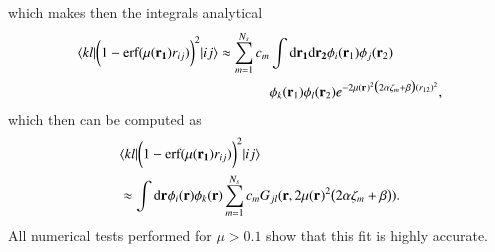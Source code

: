 \documentclass[aip,jcp,reprint,noshowkeys,superscriptaddress]{revtex4-1}
\newcommand{\matelem}[3]{\langle #1 | #2 | #3 \rangle}
\newcommand{\br}[0]{{\bf {r}}}
\newcommand{\bri}[1]{{\bf r}_{#1}}
\newcommand{\dr}[1]{\text{d}{\bf r_{#1}}}
\newcommand{\mur}[1]{\mu({\bf r_{#1}})}
\begin{document}
which makes then the integrals analytical
\begin{equation}
 \begin{aligned}
 \matelem{kl}{\bigg(1 -  \text{erf}(\mur{1} r_{ij}) \bigg)^2}{ij}  \approx \sum_{m=1}^{N_s} c_m &\int \dr{1} \dr{2}  \phi_i(\bri{1}) \phi_j(\bri{2}) \\ & \phi_k(\bri{1}) \phi_l(\bri{2}) e^{-2\mur{}^2\big(2 \alpha \zeta_m + \beta\big) (r_{12})^2} ,
 \end{aligned}
\end{equation}
which then can be computed as
\begin{equation}
 \begin{aligned}
&  \matelem{kl}{\bigg(1 -  \text{erf}(\mur{1} r_{ij}) \bigg)^2}{ij}  \\ & \approx \int \dr{} \phi_i(\br{}) \phi_k(\br{}) \sum_{m=1}^{N_s} c_m G_{jl}(\br,2\mur{}^2\big(2 \alpha \zeta_m + \beta\big)).
 \end{aligned}
\end{equation}
All numerical tests performed for $\mu > 0.1$ show that this fit is highly accurate. 
\end{document}
